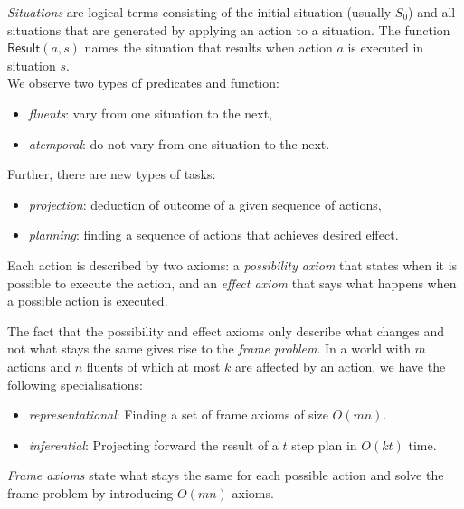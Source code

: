 \documentclass{article}
\begin{document}
\begin{definition}
    \emph{Situations} are logical terms consisting of the initial
    situation (usually $S_0$) and all situations that are generated
    by applying an action to a situation. The function $\textsf{Result}
    (a,s)$ names the situation that results when action $a$ is executed
    in situation $s$.\\
    We observe two types of predicates and function:
    \begin{itemize}
        \item \emph{fluents}: vary from one situation to the next,
        \item \emph{atemporal}: do not vary from one situation to the next.
    \end{itemize}
    Further, there are new types of tasks:
    \begin{itemize}
        \item \emph{projection}: deduction of outcome of a given sequence of actions,
        \item \emph{planning}: finding a sequence of actions that achieves desired effect.
    \end{itemize}
\end{definition}

\begin{definition}
    Each action is described by two axioms: a \emph{possibility axiom}
    that states when it is possible to execute the action, and an
    \emph{effect axiom} that says what happens when a possible action
    is executed.
\end{definition}

\begin{definition}
    The fact that the possibility and effect axioms only describe what changes
    and not what stays the same gives rise to the \emph{frame problem}. In a world
    with $m$ actions and $n$ fluents of which at most $k$ are affected by an action,
    we have the following specialisations:
    \begin{itemize}
        \item \emph{representational}: Finding a set of frame axioms of size $O(mn)$.
        \item \emph{inferential}: Projecting forward the result of a $t$ step plan in $O(kt)$ time.
    \end{itemize}
\end{definition}

\begin{theorem}
    \emph{Frame axioms} state what stays the same for each possible action and
    solve the frame problem by introducing $O(mn)$ axioms.
\end{theorem}
\end{document}
